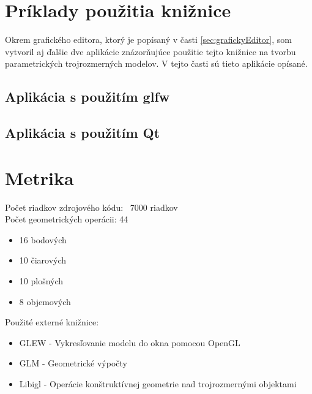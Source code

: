 \section{Príklady použitia knižnice}
Okrem grafického editora, ktorý je popísaný v časti \ref{sec:grafickyEditor}, som vytvoril aj ďalšie dve aplikácie znázorňujúce použitie tejto knižnice na tvorbu parametrických trojrozmerných modelov.  V tejto časti sú tieto aplikácie opísané.


\subsection*{Aplikácia s použitím glfw}

\subsection*{Aplikácia s použitím Qt}




\section{Metrika}
Počet riadkov zdrojového kódu: ~7000 riadkov \\
Počet geometrických operácii: 44
\begin{itemize}
    \item 16 bodových
    \item 10 čiarových
    \item 10 plošných
    \item 8 objemových
\end{itemize}
Použité externé knižnice:
\begin{itemize}
    \item GLEW - Vykresľovanie modelu do okna pomocou OpenGL
    \item GLM - Geometrické výpočty 
    \item Libigl - Operácie konštruktívnej geometrie nad trojrozmernými objektami
\end{itemize}












